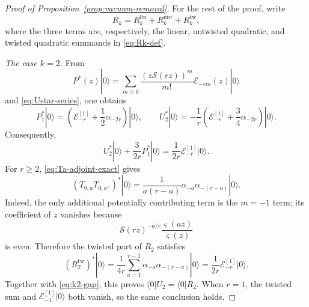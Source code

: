 \documentclass[letterpaper,12pt]{amsart}
\theoremstyle{definition}
\newcommand{\Scal}{\mathcal S}
\newcommand{\Ecal}{\mathcal E}
\newcommand{\vars}{\varsigma}
\newcommand{\vac}{|0\rangle}
\numberwithin{equation}{section}
\begin{document}
\begin{proof}[Proof of Proposition~\ref{prop:vacuum-removal}]
For the rest of the proof, write
\[
  R_k
  =
  R_k^{\mathrm{lin}}
  +
  R_k^{\mathrm{unt}}
  +
  R_k^{\mathrm{tw}},
\]
where the three terms are, respectively, the linear, untwisted quadratic,
and twisted quadratic summands in \eqref{eq:Rk-def}.

\smallskip
\noindent\emph{The case \(k=2\).}
From
\begin{equation}\label{eq:P-formula}
  P^*(z)\vac
  =
  \sum_{m\ge0}
  \frac{(z\Scal(rz))^m}{m!}\Ecal_{-rm}(z)\vac
\end{equation}
and \eqref{eq:Ustar-series}, one obtains
\[
  P_1^*\vac
  =
  \left(\Ecal_{-r}^{[1]}+\frac12\alpha_{-2r}\right)\vac,
  \qquad
  U_2^*\vac
  =
  -\frac1r\left(
    \Ecal_{-r}^{[1]}+\frac34\alpha_{-2r}
  \right)\vac.
\]
Consequently,
\begin{equation}\label{eq:k2-gap}
  U_2^*\vac+\frac{3}{2r}P_1^*\vac
  =
  \frac1{2r}\Ecal_{-r}^{[1]}\vac.
\end{equation}
For \(r\geq2\), \eqref{eq:Ta-adjoint-exact} gives
\[
  (T_{0,a}T_{0,a^\vee})^*\vac
  =
  \frac1{a(r-a)}
  \alpha_{-a}\alpha_{-(r-a)}\vac.
\]
Indeed, the only additional potentially contributing term is the
\(m=-1\) term; its coefficient of \(z\) vanishes because
\[
  \Scal(rz)^{-a/r}\frac{\vars(az)}{\vars(z)}
\]
is even.  Therefore the twisted part of \(R_2\) satisfies
\[
  (R_2^{\mathrm{tw}})^*\vac
  =
  \frac1{4r}\sum_{a=1}^{r-1}
  \alpha_{-a}\alpha_{-(r-a)}\vac
  =
  \frac1{2r}\Ecal_{-r}^{[1]}\vac.
\]
Together with \eqref{eq:k2-gap}, this proves
\(\langle0|U_2=\langle0|R_2\).  When \(r=1\), the twisted sum and
\(\Ecal_{-1}^{[1]}\vac\) both vanish, so the same conclusion holds.


\end{proof}
\end{document}
